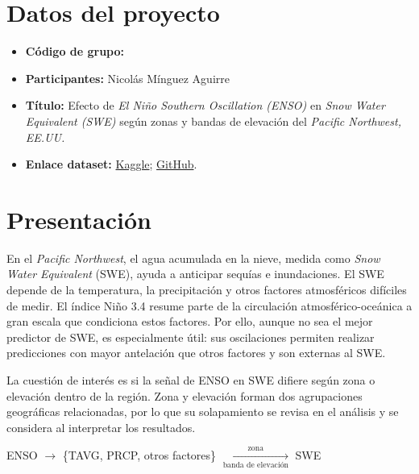 \documentclass{article}
\begin{document}
\section{Datos del proyecto}
\begin{itemize}
    \item \textbf{Código de grupo:}
    \item \textbf{Participantes:} Nicolás Mínguez Aguirre
    \item \textbf{Título:} Efecto de \textit{El Niño Southern Oscillation (ENSO)} en \textit{Snow Water Equivalent (SWE)} según zonas y bandas de elevación del \textit{Pacific Northwest, EE.UU.}
    \item \textbf{Enlace dataset:} \href{https://www.kaggle.com/datasets/nicomnguez/enso-and-swe-by-zone-and-elevation-pnw}{Kaggle}; \href{https://github.com/nicominguez/pnw_enso_swe}{GitHub}.
\end{itemize}

\section{Presentación}
En el \textit{Pacific Northwest}, el agua acumulada en la nieve, medida como \textit{Snow Water Equivalent} (SWE), ayuda a anticipar sequías e inundaciones. El SWE depende de la temperatura, la precipitación y otros factores atmosféricos difíciles de medir. El índice Niño 3.4 resume parte de la circulación atmosférico-oceánica a gran escala que condiciona estos factores\cite{enso_climate}. Por ello, aunque no sea el mejor predictor de SWE, es especialmente útil: sus oscilaciones permiten realizar predicciones con mayor antelación que otros factores y son externas al SWE.

La cuestión de interés es si la señal de ENSO en SWE difiere según zona o elevación dentro de la región. Zona y elevación forman dos agrupaciones geográficas relacionadas, por lo que su solapamiento se revisa en el análisis y se considera al interpretar los resultados.
\begin{center}
ENSO $\rightarrow$ \{TAVG, PRCP, otros factores\} $\xrightarrow[\text{banda de elevación}]{\text{zona}}$ SWE
\end{center}
\end{document}
